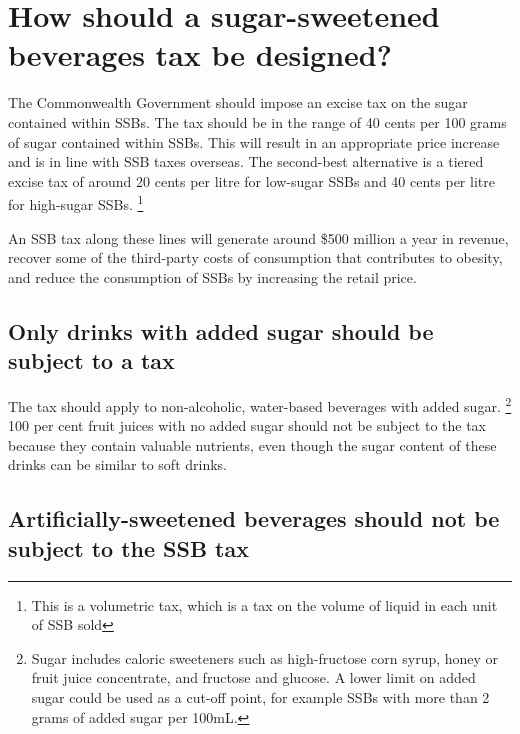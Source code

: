 \documentclass[embargoed]{grattan}
\begin{document}
\chapter{How should a sugar-sweetened beverages tax be designed?}\label{how-should-a-sugar-sweetened-beverages-tax-be-designed}

The Commonwealth Government should impose an excise tax on the sugar contained within SSBs.
The tax should be in the range of 40 cents per 100 grams of sugar contained within SSBs.
This will result in an appropriate price increase and is in line with SSB taxes overseas.
The second-best alternative is a tiered excise tax of around 20 cents per litre for low-sugar SSBs and 40 cents per litre for high-sugar SSBs.%
\footnote{This is a volumetric tax, which is a tax on the volume of liquid in each unit of SSB sold}

An SSB tax along these lines will generate around \$500 million a year in revenue, recover some of the third-party costs of consumption that contributes to obesity, and reduce the consumption of SSBs by increasing the retail price.

\section{Only drinks with added sugar should be subject to a tax}\label{only-drinks-with-added-sugar-should-be-subject-to-a-tax}

The tax should apply to non-alcoholic, water-based beverages with added sugar.%
\footnote{Sugar includes caloric sweeteners such as high-fructose corn syrup, honey or fruit juice concentrate, and fructose and glucose.
A lower limit on added sugar could be used as a cut-off point, for example SSBs with more than 2 grams of added sugar per 100mL.} 100 per cent fruit juices with no added sugar should not be subject to the tax because they contain valuable nutrients, even though the sugar content of these drinks can be similar to soft drinks.

\section{Artificially-sweetened beverages should not be subject to the SSB tax}\label{artificially-sweetened-beverages-should-not-be-subject-to-the-ssb-tax}
\end{document}
